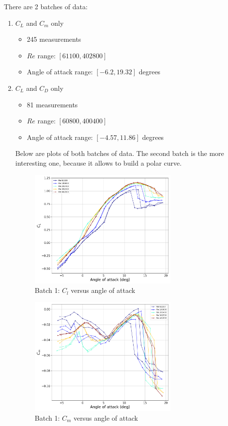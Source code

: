 \documentclass[letterpaper,12pt]{article}
\begin{document}
There are 2 batches of data:
\begin{enumerate}
    \item $C_L$ and $C_m$ only
    \begin{itemize}
        \item 245 measurements
        \item $Re$ range: $[61100, 402800]$
        \item Angle of attack range: $[-6.2, 19.32]$ degrees
    \end{itemize}

    \item $C_L$ and $C_D$ only
    \begin{itemize}
        \item 81 measurements
        \item $Re$ range: $[60800, 400400]$
        \item Angle of attack range: $[-4.57, 11.86]$ degrees
    \end{itemize}

Below are plots of both batches of data.
The second batch is the more interesting one, because it allows to build a polar curve.

\begin{figure}[H]
    \centering
    \includegraphics[width=0.7\textwidth]{dataCm_Cl}
    \caption{Batch 1: $C_l$ versus angle of attack}%
    \label{fig:cmcl}%
\end{figure}

\begin{figure}[H]
    \centering
    \includegraphics[width=0.7\textwidth]{dataCm}
    \caption{Batch 1: $C_m$ versus angle of attack}%
    \label{fig:cm}%
\end{figure}


\end{enumerate}
\end{document}
